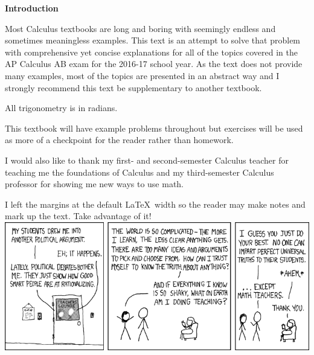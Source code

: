 \par \textbf{Introduction}
\newline
\vspace{0.125in}
\par Most Calculus textbooks are long and boring with seemingly endless and sometimes meaningless examples. This text is an attempt to solve that problem with comprehensive yet concise explanations for all of the topics covered in the AP Calculus AB exam for the 2016-17 school year. As the text does not provide many examples, most of the topics are presented in an abstract way and I strongly recommend this text be supplementary to another textbook.\\\par All trigonometry is in radians.\\\par This textbook will have example problems throughout but exercises will be used as more of a checkpoint for the reader rather than homework.\\\par I would also like to thank my first- and second-semester Calculus teacher for teaching me the foundations of Calculus and my third-semester Calculus professor for showing me new ways to use math.\\\par I left the margins at the default \LaTeX\, width so the reader may make notes and mark up the text. Take advantage of it!
\vfill
\includegraphics[width=\textwidth]{teachers.png}
\vfill

